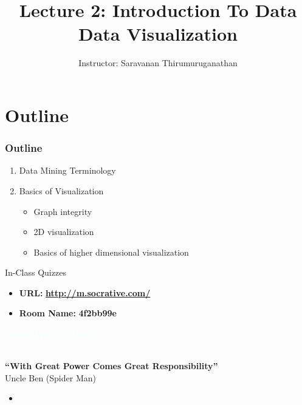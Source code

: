 \documentclass{beamer}
\title[Saravanan Thirumuruganathan] 
{Lecture 2: Introduction To Data Data Visualization}
\author[CSE 5334] 
{Instructor: Saravanan Thirumuruganathan}
\date[]
\newcommand{\thblue}[1]{{\Huge {\textcolor{azure}{#1}}}}
\begin{document}
\begin{frame}
  \titlepage
\end{frame}


\section{Outline}

\begin{frame}
\frametitle {Outline}
\begin{enumerate}
\item Data Mining Terminology
\item Basics of Visualization
    \begin{itemize}
        \item Graph integrity
        \item 2D visualization
        \item Basics of higher dimensional visualization
    \end{itemize}
\end{enumerate}
\end{frame}


\begin{frame}{In-Class Quizzes}
\begin{itemize}
\item {\Large {\bf URL:}} {\LARGE \bf \url{http://m.socrative.com/}} 
\item {\Large {\bf Room Name:} {\LARGE \bf 4f2bb99e}}
\end{itemize}
\end{frame}


\begin{frame}{} 
    \begin{center}
        \thblue{Graph Types (2D Data)} \\
    \end{center}

    \begin{center}
        ~\\
        {\bf ``With Great Power Comes Great Responsibility''} \\
        \qquad \qquad Uncle Ben (Spider Man)
    \end{center}
\end{frame}

\begin{frame}{} 
    \begin{itemize}
        \item
    \end{itemize}
\end{frame}  
\end{document}
